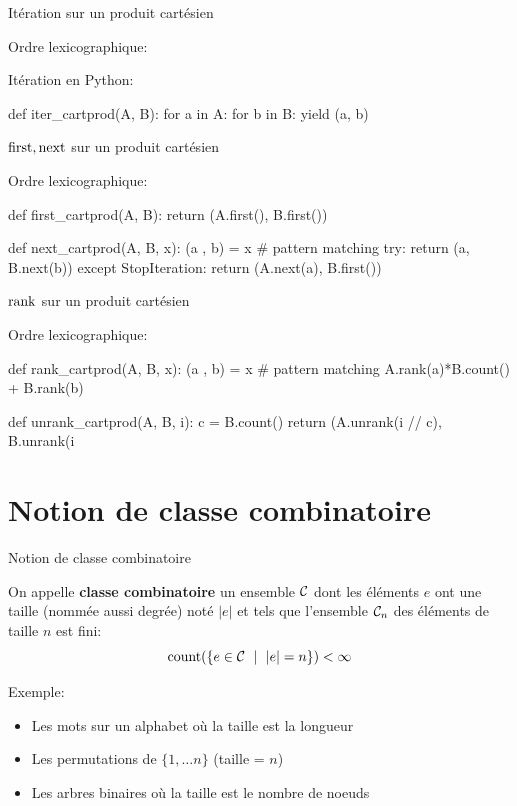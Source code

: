 \documentclass{beamer}
\begin{document}
\begin{frame}[fragile]{Itération sur un produit cartésien}

  Ordre lexicographique:
  \bigskip

  Itération en Python:
\begin{listing}{1}
    def iter_cartprod(A, B):
        for a in A:
            for b in B:
                yield (a, b)
\end{listing}
\end{frame}

\begin{frame}[fragile]{$\operatorname{first}, \operatorname{next}$ sur un produit cartésien}

  Ordre lexicographique:
  \bigskip
\begin{listing}{1}
    def first_cartprod(A, B):
        return (A.first(), B.first())

    def next_cartprod(A, B, x):
        (a , b) = x      # pattern matching
        try:
           return (a, B.next(b))
        except StopIteration:
           return (A.next(a), B.first())
\end{listing}
\end{frame}


\begin{frame}[fragile]{$\operatorname{rank}$ sur un produit cartésien}

  Ordre lexicographique:
  \bigskip
\begin{listing}{1}
    def rank_cartprod(A, B, x):
        (a , b) = x      # pattern matching
        A.rank(a)*B.count() + B.rank(b)

    def unrank_cartprod(A, B, i):
        c = B.count()
        return (A.unrank(i // c), B.unrank(i %
\end{listing}
\end{frame}


\section{Notion de classe combinatoire}

\begin{frame}{Notion de classe combinatoire}
  \begin{DEFN}
    On appelle \textbf{classe combinatoire} un ensemble $\mathcal{C}$ dont les éléments
    $e$ ont une taille (nommée aussi degrée) noté $|e|$ et tels que l'ensemble
    $\mathcal{C}_n$ des éléments de taille $n$ est fini:
    \[
    \operatorname{count}(\{e\in \mathcal{C}\ \mid\ |e| = n\}) < \infty
    \]
  \end{DEFN}
  Exemple:
  \begin{itemize}
  \item Les mots sur un alphabet où la taille est la longueur
  \item Les permutations de $\{1,\dots n\}$ (taille = $n$)
  \item Les arbres binaires où la taille est le nombre de noeuds
  \end{itemize}
\end{frame}
\end{document}
